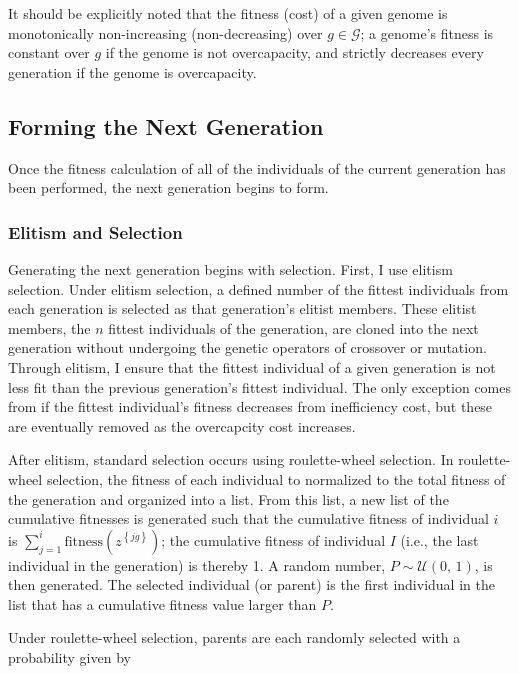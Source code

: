 \documentclass[12pt,dvipsnames]{report}
\begin{document}
It should be explicitly noted that the fitness (cost) of a given genome is monotonically non-increasing (non-decreasing) over $g \in \mathcal{G}$; a genome's fitness is constant over $g$ if the genome is not overcapacity, and strictly decreases every generation if the genome is overcapacity.

\subsection{Forming the Next Generation} \label{subsec:ga_next}

Once the fitness calculation of all of the individuals of the current generation has been performed, the next generation begins to form.

\subsubsection{Elitism and Selection}

Generating the next generation begins with selection.  First, I use elitism selection.  Under elitism selection, a defined number of the fittest individuals from each generation is selected as that generation's elitist members.  These elitist members, the $n$ fittest individuals of the generation, are cloned into the next generation without undergoing the genetic operators of crossover or mutation.  Through elitism, I ensure that the fittest individual of a given generation is not less fit than the previous generation's fittest individual.  The only exception comes from if the fittest individual's fitness decreases from inefficiency cost, but these are eventually removed as the overcapcity cost increases.

After elitism, standard selection occurs using roulette-wheel selection.  In roulette-wheel selection, the fitness of each individual to normalized to the total fitness of the generation and organized into a list.  From this list, a new list of the cumulative fitnesses is generated such that the cumulative fitness of individual $i$ is $\sum_{j = 1}^i \text{fitness} \left( z^{\left\{ jg \right\}} \right)$; the cumulative fitness of individual $I$ (i.e., the last individual in the generation) is thereby 1.  A random number, $P \sim \mathcal{U} \left( 0,\, 1 \right)$, is then generated.  The selected individual (or parent) is the first individual in the list that has a cumulative fitness value larger than $P$.

Under roulette-wheel selection, parents are each randomly selected with a probability given by
\end{document}
